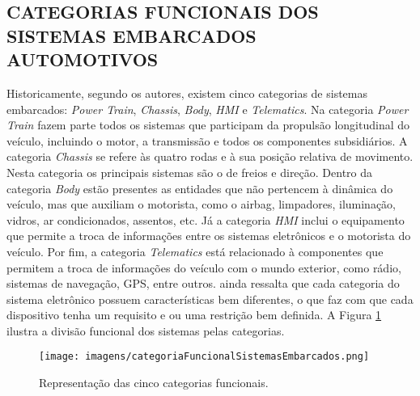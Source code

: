 \subsection{CATEGORIAS FUNCIONAIS DOS SISTEMAS EMBARCADOS AUTOMOTIVOS}
Historicamente, segundo os autores, existem cinco categorias de sistemas embarcados: \textit{Power Train}, \textit{Chassis}, \textit{Body}, \textit{HMI} e \textit{Telematics}. Na categoria \textit{Power Train} fazem parte todos os sistemas que participam da propulsão longitudinal do veículo, incluindo o motor, a transmissão e todos os componentes subsidiários. A categoria \textit{Chassis} se refere às quatro rodas e à sua posição relativa de movimento. Nesta categoria os principais sistemas são o de freios e direção. Dentro da categoria \textit{Body} estão presentes as entidades que não pertencem à dinâmica do veículo, mas que auxiliam o motorista, como o airbag, limpadores, iluminação, vidros, ar condicionados, assentos, etc. Já a categoria \textit{HMI} inclui o equipamento que permite a troca de informações entre os sistemas eletrônicos e o motorista do veículo. Por fim, a categoria \textit{Telematics} está relacionado à componentes que permitem a troca de informações do veículo com o mundo exterior, como rádio, sistemas de navegação, GPS, entre outros.  ainda ressalta que cada categoria do sistema eletrônico possuem características bem diferentes, o que faz com que cada dispositivo tenha um requisito e ou uma restrição bem definida. A Figura \ref{Fig:categorias_sistemas_embarcados} ilustra a divisão funcional dos sistemas pelas categorias.

\begin{figure}[!ht]
\centering
\caption{Representação das cinco categorias funcionais.} 
{\texttt{[image: imagens/categoriaFuncionalSistemasEmbarcados.png]}}\\
 \label{Fig:categorias_sistemas_embarcados}
\end{figure}


